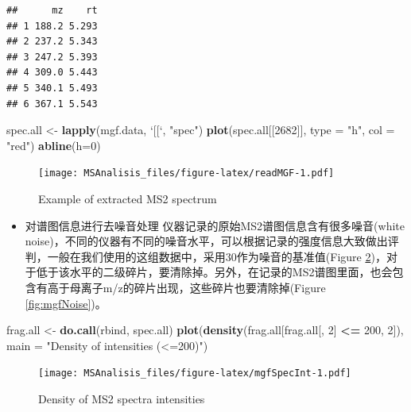 \documentclass[]{ctexbook}
\newenvironment{Shaded}{\begin{snugshade}}{\end{snugshade}}
\newcommand{\DataTypeTok}[1]{\textcolor[rgb]{0.13,0.29,0.53}{#1}}
\newcommand{\DecValTok}[1]{\textcolor[rgb]{0.00,0.00,0.81}{#1}}
\newcommand{\KeywordTok}[1]{\textcolor[rgb]{0.13,0.29,0.53}{\textbf{#1}}}
\newcommand{\NormalTok}[1]{#1}
\newcommand{\OperatorTok}[1]{\textcolor[rgb]{0.81,0.36,0.00}{\textbf{#1}}}
\newcommand{\StringTok}[1]{\textcolor[rgb]{0.31,0.60,0.02}{#1}}
\providecommand{\tightlist}{%
  \setlength{\itemsep}{0pt}\setlength{\parskip}{0pt}}
\begin{document}
\begin{verbatim}
##      mz    rt
## 1 188.2 5.293
## 2 237.2 5.343
## 3 247.2 5.393
## 4 309.0 5.443
## 5 340.1 5.493
## 6 367.1 5.543
\end{verbatim}

\begin{Shaded}
\begin{Highlighting}[]
\NormalTok{spec.all <-}\StringTok{ }\KeywordTok{lapply}\NormalTok{(mgf.data, }\StringTok{`}\DataTypeTok{[[}\StringTok{`}\NormalTok{, }\StringTok{"spec"}\NormalTok{)}
\KeywordTok{plot}\NormalTok{(spec.all[[}\DecValTok{2682}\NormalTok{]], }\DataTypeTok{type =} \StringTok{"h"}\NormalTok{, }\DataTypeTok{col =} \StringTok{"red"}\NormalTok{)}
\KeywordTok{abline}\NormalTok{(}\DataTypeTok{h=}\DecValTok{0}\NormalTok{)}
\end{Highlighting}
\end{Shaded}

\begin{figure}
\centering
\texttt{[image: MSAnalisis\_files/figure-latex/readMGF-1.pdf]}
\caption{\label{fig:readMGF}Example of extracted MS2 spectrum}
\end{figure}

\begin{itemize}
\tightlist
\item
  对谱图信息进行去噪音处理
  仪器记录的原始MS2谱图信息含有很多噪音(white noise)，不同的仪器有不同的噪音水平，可以根据记录的强度信息大致做出评判，一般在我们使用的这组数据中，采用30作为噪音的基准值(Figure \ref{fig:mgfSpecInt})，对于低于该水平的二级碎片，要清除掉。另外，在记录的MS2谱图里面，也会包含有高于母离子m/z的碎片出现，这些碎片也要清除掉(Figure \ref{fig:mgfNoise})。
\end{itemize}

\begin{Shaded}
\begin{Highlighting}[]
\NormalTok{frag.all <-}\StringTok{ }\KeywordTok{do.call}\NormalTok{(rbind, spec.all)}
\KeywordTok{plot}\NormalTok{(}\KeywordTok{density}\NormalTok{(frag.all[frag.all[, }\DecValTok{2}\NormalTok{] }\OperatorTok{<=}\StringTok{ }\DecValTok{200}\NormalTok{, }\DecValTok{2}\NormalTok{]),}
     \DataTypeTok{main =} \StringTok{"Density of intensities (<=200)"}\NormalTok{)}
\end{Highlighting}
\end{Shaded}

\begin{figure}
\centering
\texttt{[image: MSAnalisis\_files/figure-latex/mgfSpecInt-1.pdf]}
\caption{\label{fig:mgfSpecInt}Density of MS2 spectra intensities}
\end{figure}
\end{document}
